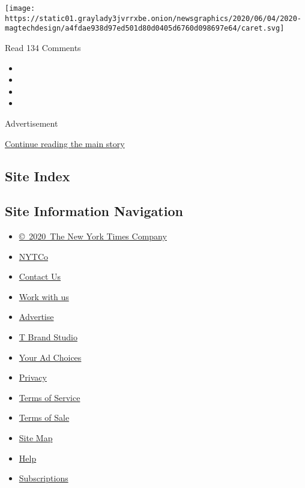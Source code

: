 \protect\hyperlink{}{} \protect\hyperlink{}{}

\texttt{[image: https://static01.graylady3jvrrxbe.onion/newsgraphics/2020/06/04/2020-magtechdesign/a4fdae938d97ed501d80d0405d6760d098697e64/caret.svg]}

Read 134 Comments

\begin{itemize}
\item
\item
\item
\item
\end{itemize}

Advertisement

\protect\hyperlink{after-bottom}{Continue reading the main story}

\hypertarget{site-index}{%
\subsection{Site Index}\label{site-index}}

\hypertarget{site-information-navigation}{%
\subsection{Site Information
Navigation}\label{site-information-navigation}}

\begin{itemize}
\tightlist
\item
  \href{https://help.nytimes3xbfgragh.onion/hc/en-us/articles/115014792127-Copyright-notice}{©~2020~The
  New York Times Company}
\end{itemize}

\begin{itemize}
\tightlist
\item
  \href{https://www.nytco.com/}{NYTCo}
\item
  \href{https://help.nytimes3xbfgragh.onion/hc/en-us/articles/115015385887-Contact-Us}{Contact
  Us}
\item
  \href{https://www.nytco.com/careers/}{Work with us}
\item
  \href{https://nytmediakit.com/}{Advertise}
\item
  \href{http://www.tbrandstudio.com/}{T Brand Studio}
\item
  \href{https://www.nytimes3xbfgragh.onion/privacy/cookie-policy\#how-do-i-manage-trackers}{Your
  Ad Choices}
\item
  \href{https://www.nytimes3xbfgragh.onion/privacy}{Privacy}
\item
  \href{https://help.nytimes3xbfgragh.onion/hc/en-us/articles/115014893428-Terms-of-service}{Terms
  of Service}
\item
  \href{https://help.nytimes3xbfgragh.onion/hc/en-us/articles/115014893968-Terms-of-sale}{Terms
  of Sale}
\item
  \href{https://spiderbites.nytimes3xbfgragh.onion}{Site Map}
\item
  \href{https://help.nytimes3xbfgragh.onion/hc/en-us}{Help}
\item
  \href{https://www.nytimes3xbfgragh.onion/subscription?campaignId=37WXW}{Subscriptions}
\end{itemize}
